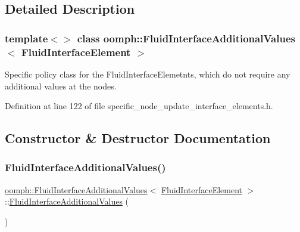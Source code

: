 \subsection{Detailed Description}
\subsubsection*{template$<$$>$\newline
class oomph\+::\+Fluid\+Interface\+Additional\+Values$<$ Fluid\+Interface\+Element $>$}

Specific policy class for the Fluid\+Interface\+Elemetnts, which do not require any additional values at the nodes. 

Definition at line 122 of file specific\+\_\+node\+\_\+update\+\_\+interface\+\_\+elements.\+h.



\subsection{Constructor \& Destructor Documentation}
\mbox{\label{classoomph_1_1FluidInterfaceAdditionalValues_3_01FluidInterfaceElement_01_4_abf3371f839088990c4b9b7aef781b505}} 
\subsubsection{\texorpdfstring{Fluid\+Interface\+Additional\+Values()}{FluidInterfaceAdditionalValues()}}
{\footnotesize\ttfamily \hyperlink{classoomph_1_1FluidInterfaceAdditionalValues}{oomph\+::\+Fluid\+Interface\+Additional\+Values}$<$ \hyperlink{classoomph_1_1FluidInterfaceElement}{Fluid\+Interface\+Element} $>$\+::\hyperlink{classoomph_1_1FluidInterfaceAdditionalValues}{Fluid\+Interface\+Additional\+Values} (\begin{DoxyParamCaption}{ }\end{DoxyParamCaption})\hspace{0.3cm}{\ttfamily [inline]}}



